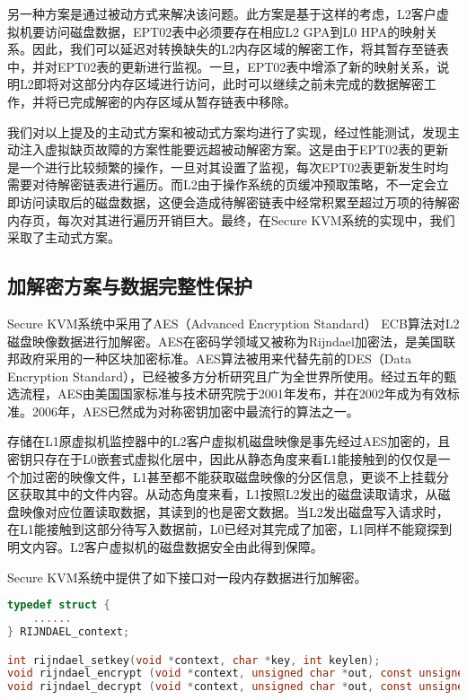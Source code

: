 另一种方案是通过被动方式来解决该问题。此方案是基于这样的考虑，L2客户虚拟机要访问磁盘数据，EPT02表中必须要存在相应L2 GPA到L0 HPA的映射关系。因此，我们可以延迟对转换缺失的L2内存区域的解密工作，将其暂存至链表中，并对EPT02表的更新进行监视。一旦，EPT02表中增添了新的映射关系，说明L2即将对这部分内存区域进行访问，此时可以继续之前未完成的数据解密工作，并将已完成解密的内存区域从暂存链表中移除。

我们对以上提及的主动式方案和被动式方案均进行了实现，经过性能测试，发现主动注入虚拟缺页故障的方案性能要远超被动解密方案。这是由于EPT02表的更新是一个进行比较频繁的操作，一旦对其设置了监视，每次EPT02表更新发生时均需要对待解密链表进行遍历。而L2由于操作系统的页缓冲预取策略，不一定会立即访问读取后的磁盘数据，这便会造成待解密链表中经常积累至超过万项的待解密内存页，每次对其进行遍历开销巨大。最终，在Secure KVM系统的实现中，我们采取了主动式方案。

\subsection{加解密方案与数据完整性保护}

Secure KVM系统中采用了AES（Advanced Encryption Standard） ECB算法对L2磁盘映像数据进行加解密。AES在密码学领域又被称为Rijndael加密法，是美国联邦政府采用的一种区块加密标准。AES算法被用来代替先前的DES（Data Encryption Standard），已经被多方分析研究且广为全世界所使用。经过五年的甄选流程，AES由美国国家标准与技术研究院于2001年发布，并在2002年成为有效标准。2006年，AES已然成为对称密钥加密中最流行的算法之一。

存储在L1原虚拟机监控器中的L2客户虚拟机磁盘映像是事先经过AES加密的，且密钥只存在于L0嵌套式虚拟化层中，因此从静态角度来看L1能接触到的仅仅是一个加过密的映像文件，L1甚至都不能获取磁盘映像的分区信息，更谈不上挂载分区获取其中的文件内容。从动态角度来看，L1按照L2发出的磁盘读取请求，从磁盘映像对应位置读取数据，其读到的也是密文数据。当L2发出磁盘写入请求时，在L1能接触到这部分待写入数据前，L0已经对其完成了加密，L1同样不能窥探到明文内容。L2客户虚拟机的磁盘数据安全由此得到保障。

Secure KVM系统中提供了如下接口对一段内存数据进行加解密。

\begin{lstlisting}[language={C}, caption={inject\_virtual\_ept\_fault实现源代码}]
typedef struct {
	......
} RIJNDAEL_context;

int rijndael_setkey(void *context, char *key, int keylen);
void rijndael_encrypt (void *context, unsigned char *out, const unsigned char *in);
void rijndael_decrypt (void *context, unsigned char *out, const unsigned char *in);
\end{lstlisting}

